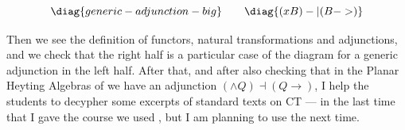 \documentclass[oneside,12pt]{article}
\begin{document}
$$
  \pu
  \diag{generic-adjunction-big}
  \qquad
  \diag{(xB)-|(B->)}
$$

Then we see the definition of functors, natural transformations and
adjunctions, and we check that the right half is a particular case of
the diagram for a generic adjunction in the left half. After that, and
after also checking that in the Planar Heyting Algebras of \cite{PH1}
we have an adjunction $(∧Q)⊣(Q→)$, I help the students to decypher
some excerpts of standard texts on CT --- in the last time that I gave
the course we used \cite{Awodey}, but I am planning to use \cite{CWM2}
the next time.

\msk
\end{document}

